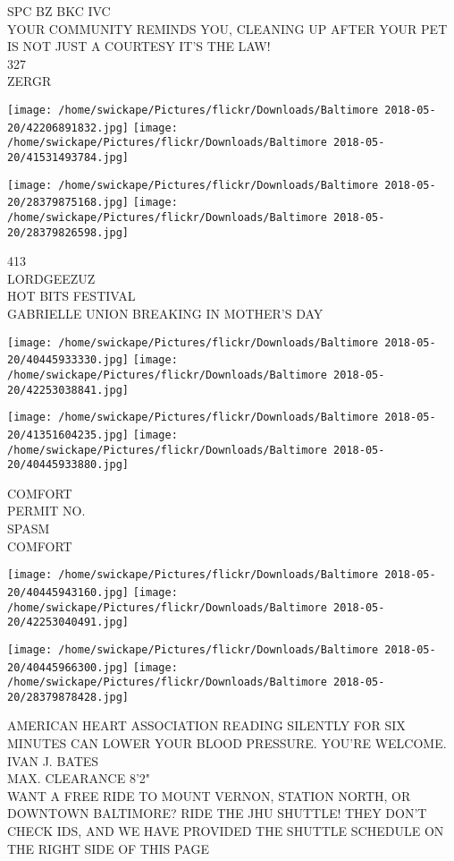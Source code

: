 \documentclass[10pt,letterpaper]{article}
\begin{document}
SPC BZ BKC IVC\\
YOUR COMMUNITY REMINDS YOU, CLEANING UP AFTER YOUR PET IS NOT JUST A COURTESY IT'S THE LAW!\\
327\\
ZERGR
\pagebreak

\texttt{[image: /home/swickape/Pictures/flickr/Downloads/Baltimore 2018-05-20/42206891832.jpg]}
\texttt{[image: /home/swickape/Pictures/flickr/Downloads/Baltimore 2018-05-20/41531493784.jpg]}

\texttt{[image: /home/swickape/Pictures/flickr/Downloads/Baltimore 2018-05-20/28379875168.jpg]}
\texttt{[image: /home/swickape/Pictures/flickr/Downloads/Baltimore 2018-05-20/28379826598.jpg]}

413\\
LORDGEEZUZ\\
HOT BITS FESTIVAL\\
GABRIELLE UNION BREAKING IN MOTHER'S DAY
\pagebreak

\texttt{[image: /home/swickape/Pictures/flickr/Downloads/Baltimore 2018-05-20/40445933330.jpg]}
\texttt{[image: /home/swickape/Pictures/flickr/Downloads/Baltimore 2018-05-20/42253038841.jpg]}

\texttt{[image: /home/swickape/Pictures/flickr/Downloads/Baltimore 2018-05-20/41351604235.jpg]}
\texttt{[image: /home/swickape/Pictures/flickr/Downloads/Baltimore 2018-05-20/40445933880.jpg]}

COMFORT\\
PERMIT NO.\\
SPASM\\
COMFORT
\pagebreak

\texttt{[image: /home/swickape/Pictures/flickr/Downloads/Baltimore 2018-05-20/40445943160.jpg]}
\texttt{[image: /home/swickape/Pictures/flickr/Downloads/Baltimore 2018-05-20/42253040491.jpg]}

\texttt{[image: /home/swickape/Pictures/flickr/Downloads/Baltimore 2018-05-20/40445966300.jpg]}
\texttt{[image: /home/swickape/Pictures/flickr/Downloads/Baltimore 2018-05-20/28379878428.jpg]}

AMERICAN HEART ASSOCIATION READING SILENTLY FOR SIX MINUTES CAN LOWER YOUR BLOOD PRESSURE.  YOU'RE WELCOME.\\
IVAN J. BATES\\
MAX. CLEARANCE 8'2"\\
WANT A FREE RIDE TO MOUNT VERNON, STATION NORTH, OR DOWNTOWN BALTIMORE?  RIDE THE JHU SHUTTLE!  THEY DON'T CHECK IDS, AND WE HAVE PROVIDED THE SHUTTLE SCHEDULE ON THE RIGHT SIDE OF THIS PAGE
\pagebreak
\end{document}
